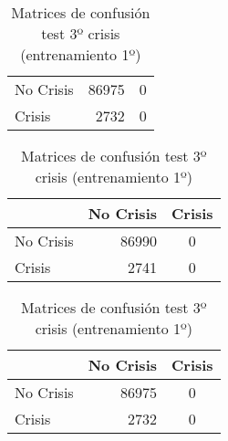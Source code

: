 \begin{table}
\begin{center}
\begin{subtable}[c]{0.4\textwidth}
\begin{tabular}{lrc}
                \hline
                No Crisis & 86975 & 0 \\
                Crisis & 2732 & 0\\
                \hline
            \end{tabular}
            \label{tab:mat-conf-stats-1.10}
        \end{subtable}
        \begin{subtable}[c]{0.4\textwidth}
            \begin{tabular}{lrc}
                \hline
                 & No Crisis & Crisis \\
                \hline
                No Crisis & 86990 & 0 \\
                Crisis & 2741 & 0\\
                \hline
            \end{tabular}
            \label{tab:mat-conf-raw-1.10}
        \end{subtable}
        \hspace{1em}\vspace{1em}
        \begin{subtable}[c]{0.4\textwidth}
                \begin{tabular}{lrc}
                \hline
                 & No Crisis & Crisis \\
                \hline
                No Crisis & 86975 & 0 \\
                Crisis & 2732 & 0\\
                \hline
            \end{tabular}
            \label{tab:mat-conf-stats-1.11}
        \end{subtable}
        \caption{Matrices de confusión test 3º crisis (entrenamiento 1º)}
        \label{tab:matriz-test-3a}
    \end{center}
\end{table}

